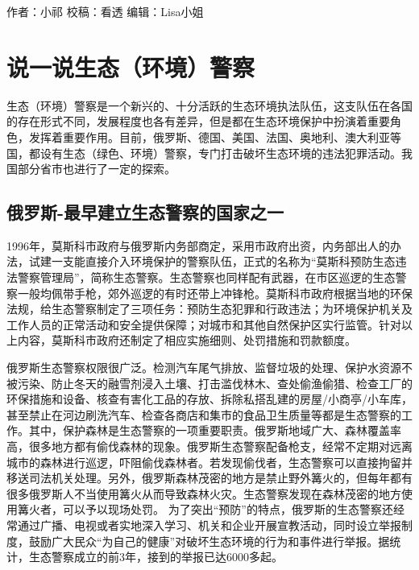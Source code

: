 \documentclass[]{book}
\begin{document}
作者：小祁
校稿：看透
编辑：Lisa小姐

\hypertarget{ux8bf4ux4e00ux8bf4ux751fux6001ux73afux5883ux8b66ux5bdf}{%
\section{说一说生态（环境）警察}\label{ux8bf4ux4e00ux8bf4ux751fux6001ux73afux5883ux8b66ux5bdf}}

生态（环境）警察是一个新兴的、十分活跃的生态环境执法队伍，这支队伍在各国的存在形式不同，发展程度也各有差异，但是都在生态环境保护中扮演着重要角色，发挥着重要作用。目前，俄罗斯、德国、美国、法国、奥地利、澳大利亚等国，都设有生态（绿色、环境）警察，专门打击破坏生态环境的违法犯罪活动。我国部分省市也进行了一定的探索。

\hypertarget{ux4fc4ux7f57ux65af-ux6700ux65e9ux5efaux7acbux751fux6001ux8b66ux5bdfux7684ux56fdux5bb6ux4e4bux4e00}{%
\subsection{俄罗斯-最早建立生态警察的国家之一}\label{ux4fc4ux7f57ux65af-ux6700ux65e9ux5efaux7acbux751fux6001ux8b66ux5bdfux7684ux56fdux5bb6ux4e4bux4e00}}

1996年，莫斯科市政府与俄罗斯内务部商定，采用市政府出资，内务部出人的办法，试建一支能直接介入环境保护的警察队伍，正式的名称为``莫斯科预防生态违法警察管理局''，简称生态警察。生态警察也同样配有武器，在市区巡逻的生态警察一般均佩带手枪，郊外巡逻的有时还带上冲锋枪。莫斯科市政府根据当地的环保法规，给生态警察制定了三项任务：预防生态犯罪和行政违法；为环境保护机关及工作人员的正常活动和安全提供保障；对城市和其他自然保护区实行监管。针对以上内容，莫斯科市政府还制定了相应实施细则、处罚措施和罚款额度。

俄罗斯生态警察权限很广泛。检测汽车尾气排放、监督垃圾的处理、保护水资源不被污染、防止冬天的融雪剂浸入土壤、打击滥伐林木、查处偷渔偷猎、检查工厂的环保措施和设备、核查有害化工品的存放、拆除私搭乱建的房屋/小商亭/小车库，甚至禁止在河边刷洗汽车、检查各商店和集市的食品卫生质量等都是生态警察的工作。其中，保护森林是生态警察的一项重要职责。俄罗斯地域广大、森林覆盖率高，很多地方都有偷伐森林的现象。俄罗斯生态警察配备枪支，经常不定期对远离城市的森林进行巡逻，吓阻偷伐森林者。若发现偷伐者，生态警察可以直接拘留并移送司法机关处理。另外，俄罗斯森林茂密的地方是禁止野外篝火的，但每年都有很多俄罗斯人不当使用篝火从而导致森林火灾。生态警察发现在森林茂密的地方使用篝火者，可以予以现场处罚。
为了突出``预防''的特点，俄罗斯的生态警察还经常通过广播、电视或者实地深入学习、机关和企业开展宣教活动，同时设立举报制度，鼓励广大民众``为自己的健康''对破坏生态环境的行为和事件进行举报。据统计，生态警察成立的前3年，接到的举报已达6000多起。
\end{document}
